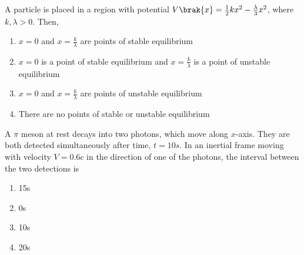         \item[45.] A particle is placed in a region with potential $V\brak{x} = \frac{1}{2}kx^2 - 
            \frac{\lambda}{3}x^2$, where $k, \lambda > 0$. Then,
            \hfill{}
            \begin{enumerate}
                \item $x = 0$ and $x = \frac{k}{\lambda}$ are points of stable equilibrium
                \item $x = 0$ is a point of stable equilibrium and  $x = \frac{k}{\lambda}$ is a point of unstable equilibrium
                \item $x = 0$ and $x = \frac{k}{\lambda}$ are points of unstable equilibrium
                \item There are no points of stable or unstable equilibrium
            \end{enumerate}
        \item[46.] A $\pi$ meson at rest decays into two photons, which move along $x$-axis. They are
            both detected simultaneously after time, $t = 10s$. In an inertial frame moving with velocity 
            $V = 0.6c$ in the direction of one of the photons, the interval between the two detections is
            \hfill{}
            \begin{enumerate}
                \item 15s
                \item 0s
                \item 10s
                \item 20s
            \end{enumerate}

